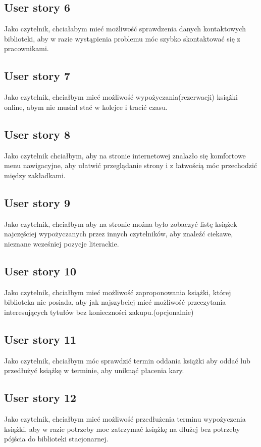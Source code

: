 \documentclass[a4paper]{article}
\begin{document}
\subsection{User story 6}
Jako czytelnik, chciałabym mieć możliwość sprawdzenia danych kontaktowych biblioteki, aby w razie wystąpienia problemu móc szybko skontaktować się z pracownikami. 

\subsection{User story 7}
Jako czytelnik, chciałbym mieć możliwość wypożyczania(rezerwacji) książki online, abym nie musiał stać w kolejce i tracić czasu. 

\subsection{User story 8}
Jako czytelnik chciałbym, aby na stronie internetowej znalazło się komfortowe menu nawigacyjne, aby ułatwić przeglądanie strony i z łatwością móc przechodzić między zakładkami.

\subsection{User story 9}
Jako czytelnik, chciałbym aby na stronie można było zobaczyć listę książek najczęściej wypożyczanych przez innych czytelników, aby znaleźć ciekawe, nieznane wcześniej pozycje literackie. 

\subsection{User story 10}
Jako czytelnik, chciałbym mieć możliwość zaproponowania książki, której biblioteka nie posiada, aby jak najszybciej mieć możliwość przeczytania interesujących tytułów bez konieczności zakupu.(opcjonalnie)

\subsection{User story 11}
Jako czytelnik, chciałbym móc sprawdzić termin oddania książki aby oddać lub przedłużyć książkę w terminie, aby uniknąć płacenia kary.

\subsection{User story 12}
Jako czytelnik, chciałbym mieć możliwość przedłużenia terminu wypożyczenia książki, aby w razie potrzeby moc zatrzymać książkę na dłużej bez potrzeby pójścia do biblioteki stacjonarnej.
\end{document}
